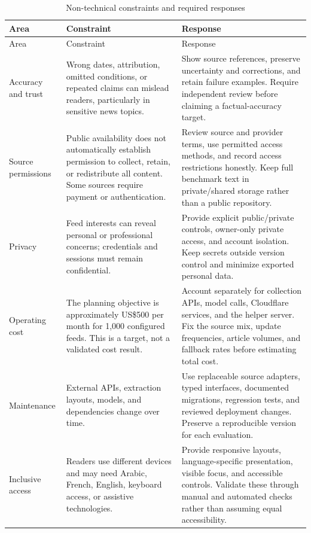 \begingroup
\small
\renewcommand{\arraystretch}{1.08}
\begin{longtable}{L{2.6cm}L{4.8cm}L{\dimexpr\linewidth-7.4cm-6\tabcolsep\relax}}
\caption{Non-technical constraints and required responses}\label{tab:nontech}\\
\toprule Area & Constraint & Response \\ \midrule
\endfirsthead
\toprule Area & Constraint & Response \\ \midrule
\endhead
\bottomrule
\endfoot
Accuracy and trust & Wrong dates, attribution, omitted conditions, or repeated claims can mislead readers, particularly in sensitive news topics.
& Show source references, preserve uncertainty and corrections, and retain failure examples. Require independent review before claiming a factual-accuracy target. \\
Source permissions & Public availability does not automatically establish permission to collect, retain, or redistribute all content. Some sources require payment or authentication.
& Review source and provider terms, use permitted access methods, and record access restrictions honestly. Keep full benchmark text in private/shared storage rather than a public repository. \\
Privacy & Feed interests can reveal personal or professional concerns; credentials and sessions must remain confidential.
& Provide explicit public/private controls, owner-only private access, and account isolation. Keep secrets outside version control and minimize exported personal data. \\
Operating cost & The planning objective is approximately US\$500 per month for 1,000 configured feeds. This is a target, not a validated cost result.
& Account separately for collection APIs, model calls, Cloudflare services, and the helper server. Fix the source mix, update frequencies, article volumes, and fallback rates before estimating total cost. \\
Maintenance & External APIs, extraction layouts, models, and dependencies change over time.
& Use replaceable source adapters, typed interfaces, documented migrations, regression tests, and reviewed deployment changes. Preserve a reproducible version for each evaluation. \\
Inclusive access & Readers use different devices and may need Arabic, French, English, keyboard access, or assistive technologies.
& Provide responsive layouts, language-specific presentation, visible focus, and accessible controls. Validate these through manual and automated checks rather than assuming equal accessibility. \\

\end{longtable}

